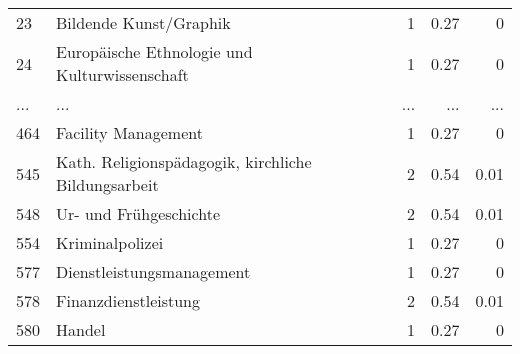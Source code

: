 \begin{longtable}{lXrrr}
        23 & \multicolumn{1}{X}{Bildende Kunst/Graphik} & %
          \num{1} &
          \num[round-mode=places,round-precision=2]{0.27} &
          \num[round-mode=places,round-precision=2]{0} \\
        24 & \multicolumn{1}{X}{Europäische Ethnologie und Kulturwissenschaft} & %
          \num{1} &
          \num[round-mode=places,round-precision=2]{0.27} &
          \num[round-mode=places,round-precision=2]{0} \\
       ... & ... & ... & ... & ... \\
        464 & \multicolumn{1}{X}{Facility Management} & %
          \num{1} &
          \num[round-mode=places,round-precision=2]{0.27} &
          \num[round-mode=places,round-precision=2]{0} \\

        545 & \multicolumn{1}{X}{Kath. Religionspädagogik, kirchliche Bildungsarbeit} & %
          \num{2} &
          \num[round-mode=places,round-precision=2]{0.54} &
          \num[round-mode=places,round-precision=2]{0.01} \\

        548 & \multicolumn{1}{X}{Ur- und Frühgeschichte} & %
          \num{2} &
          \num[round-mode=places,round-precision=2]{0.54} &
          \num[round-mode=places,round-precision=2]{0.01} \\

        554 & \multicolumn{1}{X}{Kriminalpolizei} & %
          \num{1} &
          \num[round-mode=places,round-precision=2]{0.27} &
          \num[round-mode=places,round-precision=2]{0} \\

        577 & \multicolumn{1}{X}{Dienstleistungsmanagement} & %
          \num{1} &
          \num[round-mode=places,round-precision=2]{0.27} &
          \num[round-mode=places,round-precision=2]{0} \\

        578 & \multicolumn{1}{X}{Finanzdienstleistung} & %
          \num{2} &
          \num[round-mode=places,round-precision=2]{0.54} &
          \num[round-mode=places,round-precision=2]{0.01} \\

        580 & \multicolumn{1}{X}{Handel} & %
          \num{1} &
          \num[round-mode=places,round-precision=2]{0.27} &
          \num[round-mode=places,round-precision=2]{0} \\


\end{longtable}
